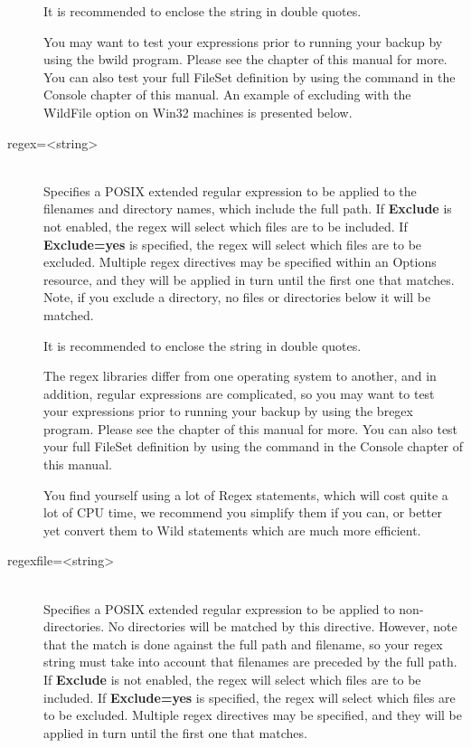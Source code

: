 \begin{description}
   It is recommended to enclose the string in double quotes.

   You may want to test your expressions prior to running your
   backup by using the bwild program. Please see the
    chapter of this manual for
   more. You can also test your full FileSet definition by using
   the  command in the Console
   chapter of this manual.
   An example of excluding with the WildFile option on Win32 machines is
   presented below.


\item [regex={\textless}string{\textgreater}] \hfill \\
   Specifies a POSIX extended regular expression to be applied to the
   filenames and directory names, which include the full path.  If {\bf
   Exclude} is not enabled, the regex will select which files are to be
   included.  If {\bf Exclude=yes} is specified, the regex will select
   which files are to be excluded.  Multiple regex directives may be
   specified within an Options resource, and they will be applied in turn
   until the first one that matches.  Note, if you exclude a directory, no
   files or directories below it will be matched.

   It is recommended to enclose the string in double quotes.

   The regex libraries differ from one operating system to
   another, and in addition, regular expressions are complicated,
   so you may want to test your expressions prior to running your
   backup by using the bregex program. Please see the
    chapter of this manual for
   more. You can also test your full FileSet definition by using
   the  command in the Console
   chapter of this manual.

   You find yourself using a lot of Regex statements, which will cost quite a lot
   of CPU time, we recommend you simplify them if you can, or better yet
   convert them to Wild statements which are much more efficient.


\item [regexfile={\textless}string{\textgreater}] \hfill \\
   Specifies a POSIX extended regular expression to be applied to
   non-directories. No directories will be matched by this directive.
   However, note that the match is done against the full path and
   filename, so your regex string must take into account that filenames
   are preceded by the full path.
   If {\bf Exclude} is not enabled, the regex will select which files are
   to be included.  If {\bf Exclude=yes} is specified, the regex will
   select which files are to be excluded.  Multiple regex directives may be
   specified, and they will be applied in turn until the first one that
   matches.


\end{description}
